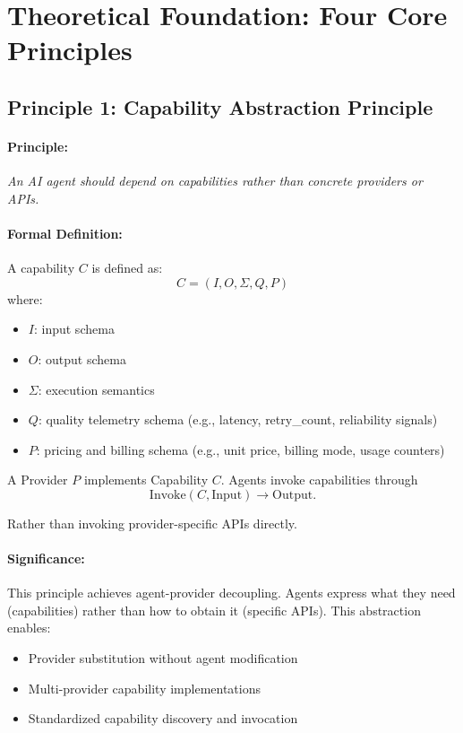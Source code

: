 \section{Theoretical Foundation: Four Core Principles}

\subsection{Principle 1: Capability Abstraction Principle}

\paragraph{Principle:}
\emph{An AI agent should depend on capabilities rather than concrete providers or APIs.}

\paragraph{Formal Definition:}
A capability $C$ is defined as:
\begin{equation}
C = (I, O, \Sigma, Q, P)
\label{eq:capability-tuple}
\end{equation}
where:
\begin{itemize}[leftmargin=*,nosep]
  \item $I$: input schema
  \item $O$: output schema
  \item $\Sigma$: execution semantics
  \item $Q$: quality telemetry schema (e.g., latency, retry\_count, reliability signals)
  \item $P$: pricing and billing schema (e.g., unit price, billing mode, usage counters)
\end{itemize}

A Provider $P$ implements Capability $C$. Agents invoke capabilities through
\begin{equation}
\mathrm{Invoke}(C, \mathrm{Input}) \rightarrow \mathrm{Output}.
\label{eq:invoke}
\end{equation}

Rather than invoking provider-specific APIs directly.

\paragraph{Significance:}
This principle achieves agent-provider decoupling. Agents express what they need (capabilities) rather than how to obtain it (specific APIs). This abstraction enables:
\begin{itemize}[leftmargin=*,nosep]
  \item Provider substitution without agent modification
  \item Multi-provider capability implementations
  \item Standardized capability discovery and invocation
\end{itemize}

